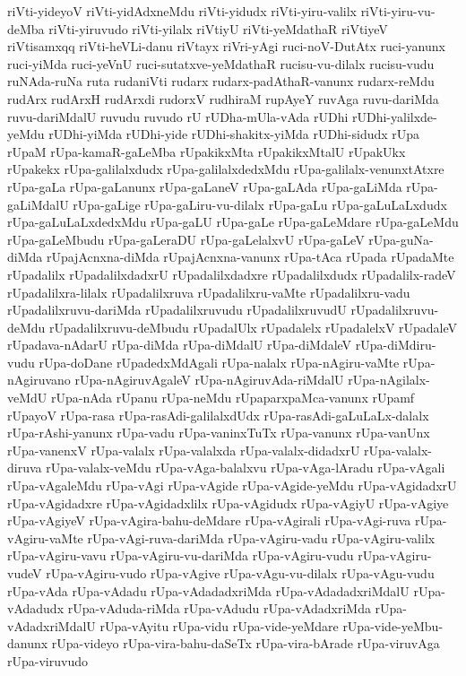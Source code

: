 {riVti-yideyoV
riVti-yidAdxneMdu
riVti-yidudx
riVti-yiru-valilx
riVti-yiru-vu-deMba
riVti-yiruvudo
riVti-yilalx
riVtiyU
riVti-yeMdathaR
riVtiyeV
riVtisamxqq
riVti-heVLi-danu
riVtayx
riVri-yAgi
ruci-noV-DutAtx
ruci-yanunx
ruci-yiMda
ruci-yeVnU
ruci-sutatxve-yeMdathaR
rucisu-vu-dilalx
rucisu-vudu
ruNAda-ruNa
ruta
rudaniVti
rudarx
rudarx-padAthaR-vanunx
rudarx-reMdu
rudArx
rudArxH
rudArxdi
rudorxV
rudhiraM
rupAyeY
ruvAga
ruvu-dariMda
ruvu-dariMdalU
ruvudu
ruvudo
rU
rUDha-mUla-vAda
rUDhi
rUDhi-yalilxde-yeMdu
rUDhi-yiMda
rUDhi-yide
rUDhi-shakitx-yiMda
rUDhi-sidudx
rUpa
rUpaM
rUpa-kamaR-gaLeMba
rUpakikxMta
rUpakikxMtalU
rUpakUkx
rUpakekx
rUpa-galilalxdudx
rUpa-galilalxdedxMdu
rUpa-galilalx-venunxtAtxre
rUpa-gaLa
rUpa-gaLanunx
rUpa-gaLaneV
rUpa-gaLAda
rUpa-gaLiMda
rUpa-gaLiMdalU
rUpa-gaLige
rUpa-gaLiru-vu-dilalx
rUpa-gaLu
rUpa-gaLuLaLxdudx
rUpa-gaLuLaLxdedxMdu
rUpa-gaLU
rUpa-gaLe
rUpa-gaLeMdare
rUpa-gaLeMdu
rUpa-gaLeMbudu
rUpa-gaLeraDU
rUpa-gaLelalxvU
rUpa-gaLeV
rUpa-guNa-diMda
rUpajAcnxna-diMda
rUpajAcnxna-vanunx
rUpa-tAca
rUpada
rUpadaMte
rUpadalilx
rUpadalilxdadxrU
rUpadalilxdadxre
rUpadalilxdudx
rUpadalilx-radeV
rUpadalilxra-lilalx
rUpadalilxruva
rUpadalilxru-vaMte
rUpadalilxru-vadu
rUpadalilxruvu-dariMda
rUpadalilxruvudu
rUpadalilxruvudU
rUpadalilxruvu-deMdu
rUpadalilxruvu-deMbudu
rUpadalUlx
rUpadalelx
rUpadalelxV
rUpadaleV
rUpadava-nAdarU
rUpa-diMda
rUpa-diMdalU
rUpa-diMdaleV
rUpa-diMdiru-vudu
rUpa-doDane
rUpadedxMdAgali
rUpa-nalalx
rUpa-nAgiru-vaMte
rUpa-nAgiruvano
rUpa-nAgiruvAgaleV
rUpa-nAgiruvAda-riMdalU
rUpa-nAgilalx-veMdU
rUpa-nAda
rUpanu
rUpa-neMdu
rUpaparxpaMca-vanunx
rUpamf
rUpayoV
rUpa-rasa
rUpa-rasAdi-galilalxdUdx
rUpa-rasAdi-gaLuLaLx-dalalx
rUpa-rAshi-yanunx
rUpa-vadu
rUpa-vaninxTuTx
rUpa-vanunx
rUpa-vanUnx
rUpa-vanenxV
rUpa-valalx
rUpa-valalxda
rUpa-valalx-didadxrU
rUpa-valalx-diruva
rUpa-valalx-veMdu
rUpa-vAga-balalxvu
rUpa-vAga-lAradu
rUpa-vAgali
rUpa-vAgaleMdu
rUpa-vAgi
rUpa-vAgide
rUpa-vAgide-yeMdu
rUpa-vAgidadxrU
rUpa-vAgidadxre
rUpa-vAgidadxlilx
rUpa-vAgidudx
rUpa-vAgiyU
rUpa-vAgiye
rUpa-vAgiyeV
rUpa-vAgira-bahu-deMdare
rUpa-vAgirali
rUpa-vAgi-ruva
rUpa-vAgiru-vaMte
rUpa-vAgi-ruva-dariMda
rUpa-vAgiru-vadu
rUpa-vAgiru-valilx
rUpa-vAgiru-vavu
rUpa-vAgiru-vu-dariMda
rUpa-vAgiru-vudu
rUpa-vAgiru-vudeV
rUpa-vAgiru-vudo
rUpa-vAgive
rUpa-vAgu-vu-dilalx
rUpa-vAgu-vudu
rUpa-vAda
rUpa-vAdadu
rUpa-vAdadadxriMda
rUpa-vAdadadxriMdalU
rUpa-vAdadudx
rUpa-vAduda-riMda
rUpa-vAdudu
rUpa-vAdadxriMda
rUpa-vAdadxriMdalU
rUpa-vAyitu
rUpa-vidu
rUpa-vide-yeMdare
rUpa-vide-yeMbu-danunx
rUpa-videyo
rUpa-vira-bahu-daSeTx
rUpa-vira-bArade
rUpa-viruvAga
rUpa-viruvudo
}
